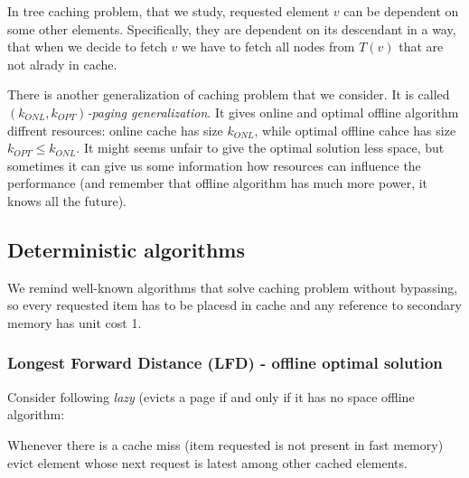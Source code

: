 In tree caching problem, that we study, requested element $v$ can be dependent 
on some other elements. Specifically, they are dependent on its descendant in a 
way, that when we decide to fetch $v$ we have to fetch all nodes from $T(v)$ 
that are not alrady in cache.

There is another generalization of caching problem that we consider. It is 
called $(k_{ONL}, k_{OPT})$\textit{-paging generalization}. It gives online and 
optimal offline algorithm diffrent resources: online cache has size $k_{ONL}$, 
while optimal offline cahce has size $k_{OPT} \leq k_{ONL}$. It might seems 
unfair to give the optimal solution less space, but sometimes it can give us 
some information how resources can influence the performance (and remember that 
offline algorithm has much more power, it knows all the future). 

\subsection{Deterministic algorithms}
We remind well-known algorithms that solve caching problem without bypassing, 
so every requested item has to be placesd in cache and any reference to 
secondary memory has unit cost 1.
\subsubsection{Longest Forward Distance (LFD) - offline optimal solution}
Consider following \textit{lazy} (evicts a page if and only if it has no space  
offline algorithm: 
\begin{myalgo}
Whenever there is a cache miss (item requested is not 
present in fast memory) evict element whose next request is latest among other 
cached elements.
\end{myalgo}


